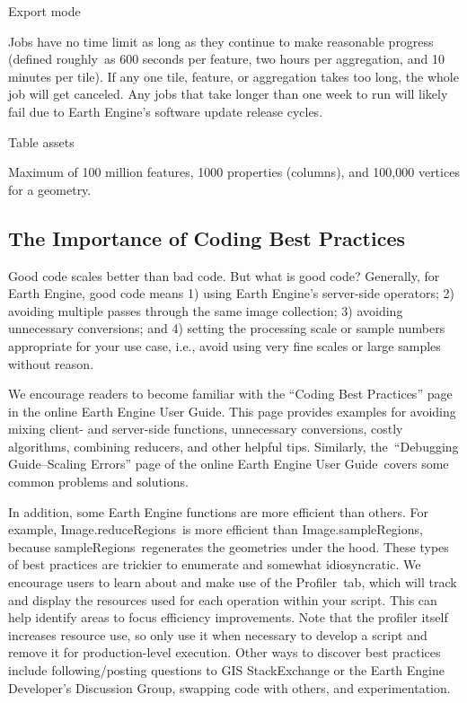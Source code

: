 \documentclass[
  letterpaper,
  DIV=11,
  numbers=noendperiod]{scrreprt}
\begin{document}
Export mode

Jobs have no time limit as long as they continue to make reasonable
progress (defined roughly~as 600 seconds per feature, two hours per
aggregation, and 10 minutes per tile). If any one tile, feature, or
aggregation takes too long, the whole job will get canceled. Any jobs
that take longer than one week to run will likely fail due to Earth
Engine's software update release cycles.

Table assets

Maximum of 100 million features, 1000 properties (columns), and 100,000
vertices for a geometry.

\hypertarget{the-importance-of-coding-best-practices}{%
\subsection{The Importance of Coding Best
Practices}\label{the-importance-of-coding-best-practices}}

Good code scales better than bad code. But what is good code? Generally,
for Earth Engine, good code means 1) using Earth Engine's server-side
operators; 2) avoiding multiple passes through the same image
collection; 3) avoiding unnecessary conversions; and 4) setting the
processing scale or sample numbers appropriate for your use case, i.e.,
avoid using very fine scales or large samples without reason.

We encourage readers to become familiar with the ``Coding Best
Practices'' page in the online Earth Engine User Guide. This page
provides examples for avoiding mixing client- and server-side functions,
unnecessary conversions, costly algorithms, combining reducers, and
other helpful tips. Similarly, the~``Debugging Guide--Scaling Errors''
page of the online Earth Engine User Guide~covers some common problems
and solutions.

In addition, some Earth Engine functions are more efficient than others.
For example, Image.reduceRegions~is more efficient than
Image.sampleRegions, because sampleRegions~regenerates the geometries
under the hood. These types of best practices are trickier to enumerate
and somewhat idiosyncratic. We encourage users to learn about and make
use of the Profiler~tab, which will track and display the resources used
for each operation within your script. This can help identify areas to
focus efficiency improvements. Note that the profiler itself increases
resource use, so only use it when necessary to develop a script and
remove it for production-level execution. Other ways to discover best
practices include following/posting questions to GIS StackExchange or
the Earth Engine Developer's Discussion Group, swapping code with
others, and experimentation.
\end{document}
